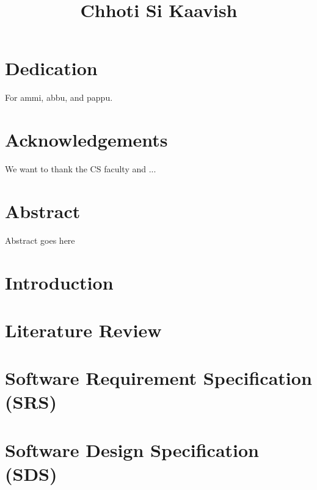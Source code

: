 \documentclass[12pt,twosided]{report}
\title{Chhoti Si Kaavish}
\begin{document}

\chapter*{Dedication}
For ammi, abbu, and pappu.

\chapter*{Acknowledgements}
We want to thank the CS faculty and ...

\chapter*{Abstract}
Abstract goes here

\tableofcontents
\listoffigures
\listoftables


\chapter{Introduction}
\label{chap:intro}


\chapter{Literature Review}
\label{chap:lit}


\chapter{Software Requirement Specification (SRS)}
\label{chap:srs}


\chapter{Software Design Specification (SDS)}
\label{chap:sds}

\end{document}
